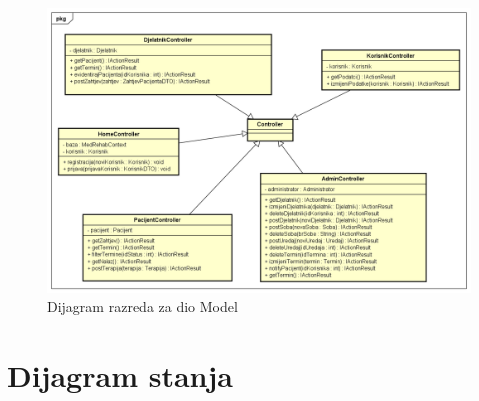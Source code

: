 			\begin{figure}[H]
				\includegraphics[scale=0.45]{slike/Dijagram_razreda_3.PNG} %
				\centering
				\caption{Dijagram razreda za dio Model}
				\label{fig:dijagram_razreda_3}
			\end{figure}
			
			
			
			
			\eject
		
		\section{Dijagram stanja}
			
